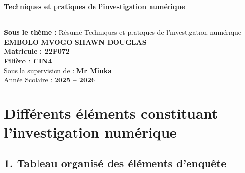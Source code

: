 \documentclass[12pt]{article}
\begin{document}
\vspace{2cm}

\begin{center} 
	\colorbox{orange!80}{
        \parbox{\dimexpr\textwidth-4\fboxsep}{
            \centering
            {\LARGE \textbf{Techniques et pratiques de l'investigation numérique}}
        }
    }\\[0.8cm]
    {\large \textbf{Sous le thème :} Résumé Techniques et pratiques de l'investigation numérique}\\[1.5cm]

    \textbf{{EMBOLO MVOGO SHAWN DOUGLAS}}\\[0.8cm]
    \textbf{{Matricule : 22P072}}\\[0.8cm]
    \textbf{{Filière : CIN4}}\\[0.8cm]
    Sous la supervision de : \textbf{Mr Minka}\\[1.5cm]

    Année Scolaire : \textbf{2025 -- 2026}
\end{center}


\newpage
\setcounter{page}{1}

\newpage


\section*{Différents éléments constituant l’investigation numérique}

\subsection*{1. Tableau organisé des éléments d’enquête}
\end{document}
